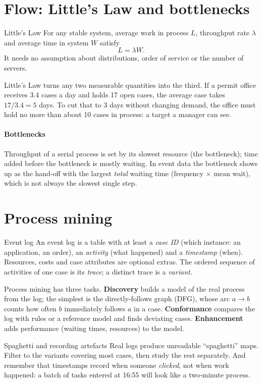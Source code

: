 \section{Flow: Little's Law and bottlenecks}
\begin{keyformula}{Little's Law}
For any stable system, average work in process $L$, throughput rate $\lambda$ and average time in system $W$ satisfy
\[ L=\lambda W. \]
It needs no assumption about distributions, order of service or the number of servers.
\end{keyformula}
Little's Law turns any two measurable quantities into the third. If a permit office receives 3.4 cases a day and holds
17 open cases, the average case takes $17/3.4=5$ days. To cut that to 3 days without changing demand, the office must
hold no more than about 10 cases in process: a target a manager can see.

\paragraph{Bottlenecks} Throughput of a serial process is set by its slowest resource (the bottleneck); time added
before the bottleneck is mostly waiting. In event data the bottleneck shows up as the hand-off with the largest
\emph{total} waiting time (frequency $\times$ mean wait), which is not always the slowest single step.

\section{Process mining}
\begin{definition}{Event log}
An event log is a table with at least a \emph{case ID} (which instance: an application, an order), an \emph{activity}
(what happened) and a \emph{timestamp} (when). Resources, costs and case attributes are optional extras. The ordered
sequence of activities of one case is its \emph{trace}; a distinct trace is a \emph{variant}.
\end{definition}

Process mining has three tasks. \textbf{Discovery} builds a model of the real process from the log; the simplest is
the directly-follows graph (DFG), whose arc $a\rightarrow b$ counts how often $b$ immediately follows $a$ in a case.
\textbf{Conformance} compares the log with rules or a reference model and finds deviating cases. \textbf{Enhancement}
adds performance (waiting times, resources) to the model.

\begin{pitfall}{Spaghetti and recording artefacts}
Real logs produce unreadable ``spaghetti'' maps. Filter to the variants covering most cases, then study the rest
separately. And remember that timestamps record when someone \emph{clicked}, not when work happened: a batch of
tasks entered at 16:55 will look like a two-minute process.
\end{pitfall}

